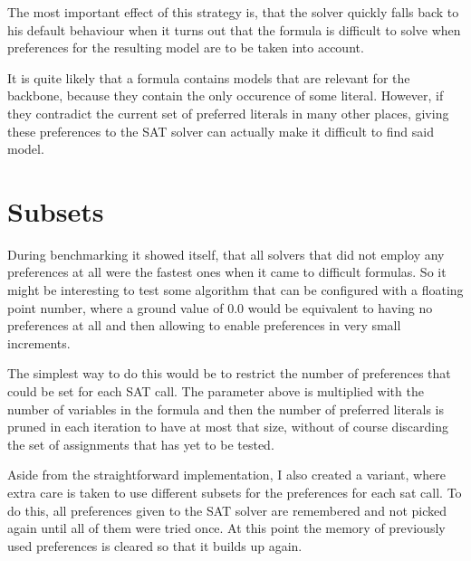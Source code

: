 The most important effect of this strategy is, that the solver quickly falls back to his default behaviour when it turns out that the formula is difficult to solve when preferences for the resulting model are to be taken into account. 

It is quite likely that a formula contains models that are relevant for the backbone, because they contain the only occurence of some literal. However, if they contradict the current set of preferred literals in many other places, giving these preferences to the SAT solver can actually make it difficult to find said model.

\section{Subsets}
During benchmarking it showed itself, that all solvers that did not employ any preferences at all were the fastest ones when it came to difficult formulas. So it might be interesting to test some algorithm that can be configured with a floating point number, where a ground value of $0.0$ would be equivalent to having no preferences at all and then allowing to enable preferences in very small increments.

The simplest way to do this would be to restrict the number of preferences that could be set for each SAT call. The parameter above is multiplied with the number of variables in the formula and then the number of preferred literals is pruned in each iteration to have at most that size, without of course discarding the set of assignments that has yet to be tested.

Aside from the straightforward implementation, I also created a variant, where extra care is taken to use different subsets for the preferences for each sat call. To do this, all preferences given to the SAT solver are remembered and not picked again until all of them were tried once. At this point the memory of previously used preferences is cleared so that it builds up again.





